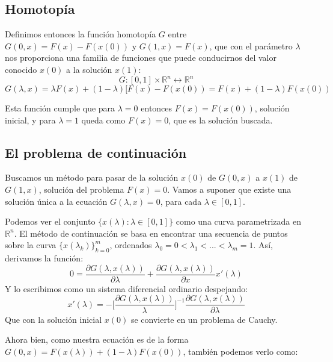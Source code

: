\subsection{Homotopía}
Definimos entonces la función homotopía $G$ entre $G(0,x) = F(x)-F(x(0))$ y $G(1,x) = F(x)$, que con el parámetro $\lambda$ nos proporciona una familia de funciones que puede conducirnos del valor conocido $x(0)$ a la solución $x(1)$:
\[G:[0,1] \times \mathbb{R}^n \longleftrightarrow \mathbb{R}^n\]
\[G(\lambda,x) = \lambda F(x) + (1- \lambda) [F(x)- F(x(0)) = F(x) + (1-\lambda) F(x(0))\]

Esta función cumple que para $\lambda = 0$ entonces $F(x) = F(x(0))$, solución inicial, y para $\lambda = 1$ queda como $F(x) = 0$, que es la solución buscada.

\subsection{El problema de continuación}

Buscamos un método para pasar de la solución $x(0)$ de $G(0,x)$ a $x(1)$ de $G(1,x)$, solución del problema $F(x) = 0$. Vamos a suponer que existe una solución única a la ecuación $G(\lambda,x) = 0$, para cada $\lambda \in [0,1]$.

Podemos ver el conjunto $\{x(\lambda):\lambda \in [0,1]\}$ como una curva parametrizada en $\mathbb{R}^n$.
El método de continuación se basa en encontrar una secuencia de puntos sobre la curva $\{x(\lambda_k)\}_{k=0}^{m}$, ordenados $\lambda_0 = 0 < \lambda_1 <...< \lambda_m = 1$. Así, derivamos la función:
\[0 = \frac{\partial G(\lambda,x(\lambda))}{\partial \lambda} + \frac{\partial G(\lambda,x(\lambda))}{\partial x} x'(\lambda)\]
Y lo escribimos como un sistema diferencial ordinario despejando:
\[x'(\lambda) = -\Big[\frac{\partial G(\lambda,x(\lambda))}{\lambda}\Big]^{-1}\frac{\partial G(\lambda,x(\lambda))}{\partial \lambda}\]
Que con la solución inicial $x(0)$ se convierte en un problema de Cauchy.

Ahora bien, como nuestra ecuación es de la forma $G(0,x) = F(x(\lambda))+(1-\lambda)F(x(0))$, también podemos verlo como:

